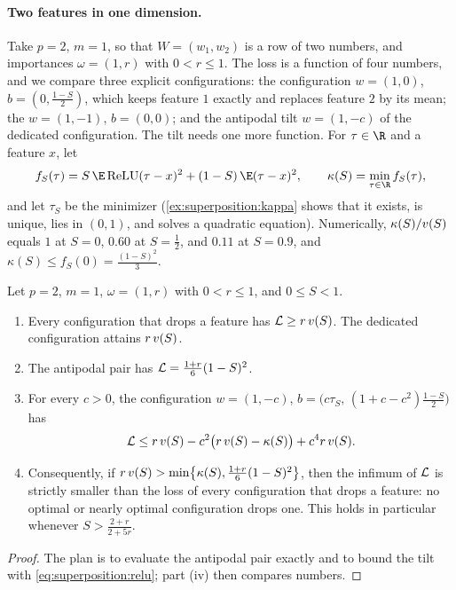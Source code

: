 \begin{refsection}
\paragraph{Two features in one dimension.} Take $p=2$, $m=1$, so that $W=(w_1,w_2)$ is a row of two numbers, and importances $\omega=(1,r)$ with $0<r\le1$. The loss is a function of four numbers, and we compare three explicit configurations: the  configuration $w=(1,0)$, $b=(0,\frac{1-S}2)$, which keeps feature $1$ exactly and replaces feature $2$ by its mean; the  $w=(1,-1)$, $b=(0,0)$; and the antipodal tilt $w=(1,-c)$ of the dedicated configuration. The tilt needs one more function. For $\tau\in\R$ and a feature $x$, let
\begin{equation}\label{eq:superposition:f}
  f_S(\tau)=S\,\E\relu(\tau-x)^2+(1-S)\,\E(\tau-x)^2,\qquad \kappa(S)=\min_{\tau\in\R}f_S(\tau),
\end{equation}
and let $\tau_S$ be the minimizer (\cref{ex:superposition:kappa} shows that it exists, is unique, lies in $(0,1)$, and solves a quadratic equation). Numerically, $\kappa(S)/v(S)$ equals $1$ at $S=0$, $0.60$ at $S=\frac12$, and $0.11$ at $S=0.9$, and $\kappa(S)\le f_S(0)=\frac{(1-S)^2}3$.

\begin{theorem}\label{thm:superposition:two}
Let $p=2$, $m=1$, $\omega=(1,r)$ with $0<r\le1$, and $0\le S<1$.
\begin{enumerate}
\item Every configuration that drops a feature has $\mathcal{L}\ge r\,v(S)$. The dedicated configuration attains $r\,v(S)$.
\item The antipodal pair has $\mathcal{L}=\frac{1+r}6(1-S)^2$.
\item For every $c>0$, the configuration $w=(1,-c)$, $b=\bigl(c\tau_S,\,(1+c-c^2)\frac{1-S}2\bigr)$ has
\[
  \mathcal{L}\le r\,v(S)-c^2\bigl(r\,v(S)-\kappa(S)\bigr)+c^4r\,v(S) .
\]
\item Consequently, if $r\,v(S)>\min\bigl\{\kappa(S),\frac{1+r}6(1-S)^2\bigr\}$, then the infimum of $\mathcal{L}$ is strictly smaller than the loss of every configuration that drops a feature: no optimal or nearly optimal configuration drops one. This holds in particular whenever $S>\frac{2+r}{2+5r}$.
\end{enumerate}
\end{theorem}

\begin{proof}
The plan is to evaluate the antipodal pair exactly and to bound the tilt with \eqref{eq:superposition:relu}; part (iv) then compares numbers.


\end{proof}
\end{refsection}

